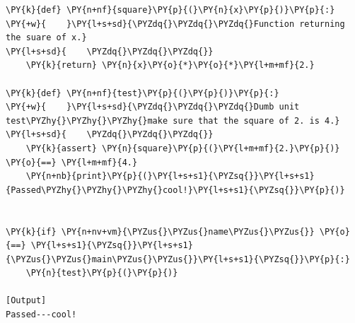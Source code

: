 \begin{Verbatim}[label=\makebox{\url{https://github.com/lucabaldini/cmepda/tree/master/slides/latex/snippets/unit\_test\_naive.py}},commandchars=\\\{\}]
\PY{k}{def} \PY{n+nf}{square}\PY{p}{(}\PY{n}{x}\PY{p}{)}\PY{p}{:}
\PY{+w}{    }\PY{l+s+sd}{\PYZdq{}\PYZdq{}\PYZdq{}Function returning the suare of x.}
\PY{l+s+sd}{    \PYZdq{}\PYZdq{}\PYZdq{}}
    \PY{k}{return} \PY{n}{x}\PY{o}{*}\PY{o}{*}\PY{l+m+mf}{2.}

\PY{k}{def} \PY{n+nf}{test}\PY{p}{(}\PY{p}{)}\PY{p}{:}
\PY{+w}{    }\PY{l+s+sd}{\PYZdq{}\PYZdq{}\PYZdq{}Dumb unit test\PYZhy{}\PYZhy{}\PYZhy{}make sure that the square of 2. is 4.}
\PY{l+s+sd}{    \PYZdq{}\PYZdq{}\PYZdq{}}
    \PY{k}{assert} \PY{n}{square}\PY{p}{(}\PY{l+m+mf}{2.}\PY{p}{)} \PY{o}{==} \PY{l+m+mf}{4.}
    \PY{n+nb}{print}\PY{p}{(}\PY{l+s+s1}{\PYZsq{}}\PY{l+s+s1}{Passed\PYZhy{}\PYZhy{}\PYZhy{}cool!}\PY{l+s+s1}{\PYZsq{}}\PY{p}{)}


\PY{k}{if} \PY{n+nv+vm}{\PYZus{}\PYZus{}name\PYZus{}\PYZus{}} \PY{o}{==} \PY{l+s+s1}{\PYZsq{}}\PY{l+s+s1}{\PYZus{}\PYZus{}main\PYZus{}\PYZus{}}\PY{l+s+s1}{\PYZsq{}}\PY{p}{:}
    \PY{n}{test}\PY{p}{(}\PY{p}{)}

[Output]
Passed---cool!
\end{Verbatim}